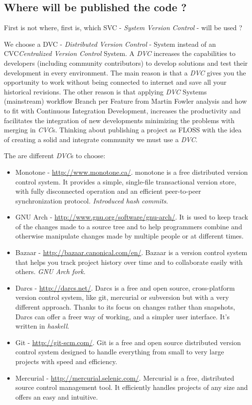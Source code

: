 \documentclass[11pt]{scrartcl}
\begin{document}
\subsection{Where will be published the code ?}
\label{sub:publish-code}

\par First is not where, first is, which SVC - \emph{System Version Control} - will be used ?

\par We choose a DVC - \emph{Distributed Version Control} - System instead of an CVC\emph{Centralized Version Control} System. A \emph{DVC} increases the capabilities to developers (including community contributors) to develop solutions and test their development in every environment. The main reason is that a \emph{DVC} gives you the opportunity to work without being connected to internet and save all your historical revisions. The other reason is that applying \emph{DVC} Systems (mainstream) workflow Branch per Feature from Martin Fowler analysis\cite{branch-per-feature} and how to fit with Continuous Integration Development, increases the productivity and facilitates the integration of new developments minimizing the problems with merging in \emph{CVC}s. Thinking about publishing a project as FLOSS with the idea of creating a solid and integrate community we must use a \emph{DVC}.

\par The are different \emph{DVC}s to choose:
\begin{itemize}
    \item Monotone - \url{http://www.monotone.ca/}. monotone is a free distributed version control system. It provides a simple, single-file transactional version store, with fully disconnected operation and an efficient peer-to-peer synchronization protocol. \emph{Introduced hash commits}.
	\item GNU Arch - \url{http://www.gnu.org/software/gnu-arch/}. It is used to keep track of the changes made to a source tree and to help programmers combine and otherwise manipulate changes made by multiple people or at different times.
	\item Bazaar - \url{http://bazaar.canonical.com/en/}. Bazaar is a version control system that helps you track project history over time and to collaborate easily with others. \emph{GNU Arch fork}.
	\item Darcs - \url{http://darcs.net/}. Darcs is a free and open source, cross-platform version control system, like git, mercurial or subversion but with a very different approach. Thanks to its focus on changes rather than snapshots, Darcs can offer a freer way of working, and a simpler user interface. It's written in \emph{haskell}.
	\item Git - \url{http://git-scm.com/}. Git is a free and open source distributed version control system designed to handle everything from small to very large projects with speed and efficiency.
	\item Mercurial - \url{http://mercurial.selenic.com/}. Mercurial is a free, distributed source control management tool. It efficiently handles projects of any size and offers an easy and intuitive. 
\end{itemize}
\end{document}
